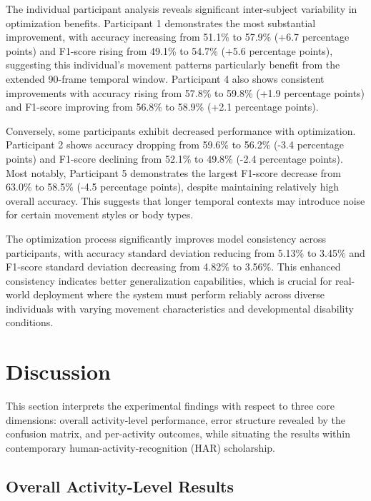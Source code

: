\documentclass{iopconfser}
\begin{document}
The individual participant analysis reveals significant inter-subject variability in optimization benefits. Participant 1 demonstrates the most substantial improvement, with accuracy increasing from 51.1\% to 57.9\% (+6.7 percentage points) and F1-score rising from 49.1\% to 54.7\% (+5.6 percentage points), suggesting this individual's movement patterns particularly benefit from the extended 90-frame temporal window. Participant 4 also shows consistent improvements with accuracy rising from 57.8\% to 59.8\% (+1.9 percentage points) and F1-score improving from 56.8\% to 58.9\% (+2.1 percentage points).

Conversely, some participants exhibit decreased performance with optimization. Participant 2 shows accuracy dropping from 59.6\% to 56.2\% (-3.4 percentage points) and F1-score declining from 52.1\% to 49.8\% (-2.4 percentage points). Most notably, Participant 5 demonstrates the largest F1-score decrease from 63.0\% to 58.5\% (-4.5 percentage points), despite maintaining relatively high overall accuracy. This suggests that longer temporal contexts may introduce noise for certain movement styles or body types.

The optimization process significantly improves model consistency across participants, with accuracy standard deviation reducing from 5.13\% to 3.45\% and F1-score standard deviation decreasing from 4.82\% to 3.56\%. This enhanced consistency indicates better generalization capabilities, which is crucial for real-world deployment where the system must perform reliably across diverse individuals with varying movement characteristics and developmental disability conditions.

\section{Discussion}

This section interprets the experimental findings with respect to three core dimensions: overall activity-level performance, error structure revealed by the confusion matrix, and per-activity outcomes, while situating the results within contemporary human-activity-recognition (HAR) scholarship.

\subsection{Overall Activity-Level Results}
\end{document}
